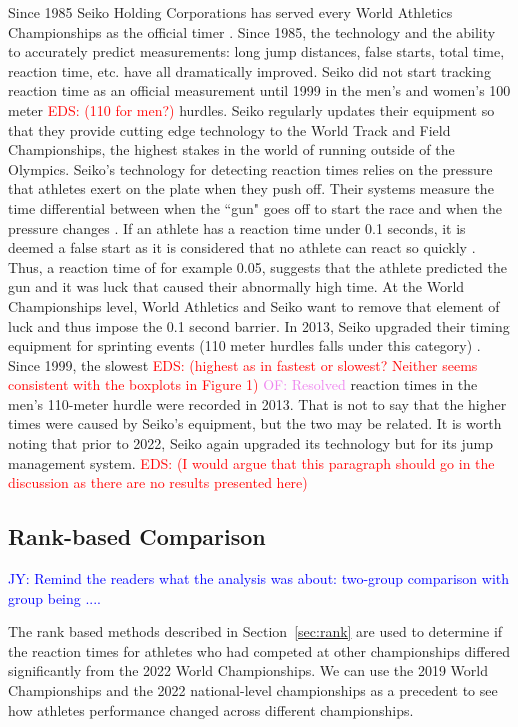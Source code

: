 \documentclass[12pt, letterpaper, titlepage]{article}
\newcommand{\jy}[1]{\textcolor{blue}{JY: #1}}
\newcommand{\eds}[1]{\textcolor{red}{EDS: (#1)}}
\newcommand{\of}[1]{\textcolor{violet}{OF: #1}}
\begin{document}
Since 1985 Seiko Holding Corporations has served every World Athletics 
Championships as the official timer \citep{wa2022seiko}.  Since 1985, the 
technology and the ability
to accurately predict measurements: long jump distances, false starts, total 
time, reaction time, etc. have all dramatically improved.  Seiko did not start 
tracking reaction time as an official measurement until 1999 in the men's and 
women's 100 meter \eds{110 for men?} hurdles. 
Seiko regularly updates their equipment so that they provide cutting edge
technology to the World Track and Field Championships, the highest stakes in the 
world of running outside of the Olympics. Seiko's technology for detecting 
reaction times relies on the pressure that athletes exert on the plate when they 
push off.  Their systems measure the time differential
between when the ``gun" goes off to start the race and when the pressure changes 
\citep{wa2022seiko}.  If an athlete has a reaction time under 0.1 seconds, it 
is deemed a 
false start as it is considered that no athlete can react so quickly 
\citep{Seiko-Timing}.  Thus, a reaction time of for example 0.05, suggests that 
the athlete predicted the gun and it was luck that caused their abnormally high 
time.  At the World Championships level, World Athletics and Seiko want to remove 
that element of luck and thus impose the 0.1 second barrier. In 2013, Seiko 
upgraded their timing equipment for sprinting events (110 meter hurdles falls 
under this category) \citep{wa2013backtage}. Since 1999, the
slowest \eds{highest as in fastest or slowest? Neither seems consistent with 
the boxplots in Figure 1} \of{Resolved} reaction 
times in the men's 110-meter hurdle were recorded in 2013.  That is not to say
 that the higher 
times were caused by Seiko's equipment, but the two may be related.  It is worth 
noting that prior
to 2022, Seiko again upgraded its technology but for its jump management system.
\eds{I would argue that this paragraph should go in the discussion as there are 
no results presented here}

\subsection{Rank-based Comparison} \label{subsec:Results_Rank}

\jy{Remind the readers what the analysis was about: two-group comparison with
  group being ....}

The rank based methods described in Section~\ref{sec:rank} are used
to determine if the reaction times for athletes who had competed at other 
championships differed significantly from the 2022 World Championships.  We can
use the 2019 World Championships and the 2022 national-level championships as a 
precedent to see how athletes performance changed across different championships.
\end{document}
